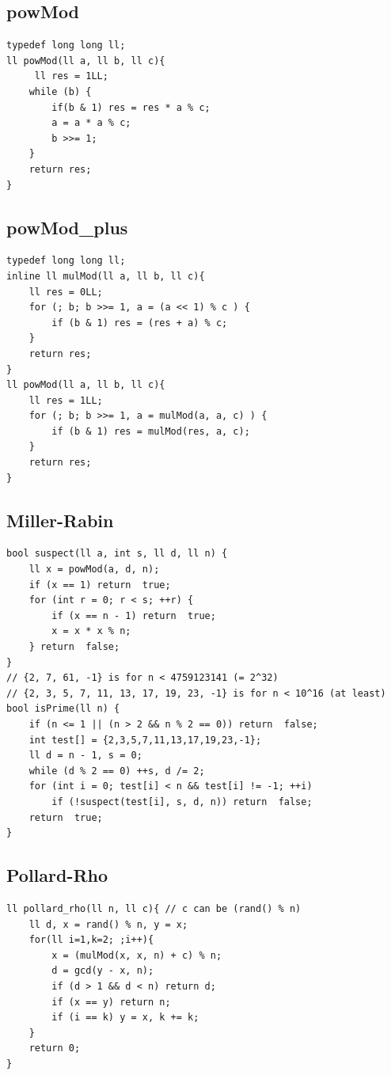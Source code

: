 \documentclass[a4paper]{article}
\begin{document}
\begin{CJK*}{UTF8}{gbsn}
\begin{multicols}{3}
\begin{flushleft}
\subsection{powMod}
\begin{lstlisting}
typedef long long ll;
ll powMod(ll a, ll b, ll c){
	 ll res = 1LL;
	while (b) {
		if(b & 1) res = res * a % c;
		a = a * a % c;
		b >>= 1;
	}
	return res;
}
\end{lstlisting}

\subsection{powMod\_plus}
\begin{lstlisting}
typedef long long ll;
inline ll mulMod(ll a, ll b, ll c){
	ll res = 0LL;
	for (; b; b >>= 1, a = (a << 1) % c ) {
		if (b & 1) res = (res + a) % c;
	}
	return res;
}
ll powMod(ll a, ll b, ll c){
	ll res = 1LL;
	for (; b; b >>= 1, a = mulMod(a, a, c) ) {
		if (b & 1) res = mulMod(res, a, c);
	}
	return res;
}
\end{lstlisting}

\subsection{Miller-Rabin}
\begin{lstlisting}
bool suspect(ll a, int s, ll d, ll n) {
	ll x = powMod(a, d, n);
	if (x == 1) return  true;
	for (int r = 0; r < s; ++r) {
		if (x == n - 1) return  true;
		x = x * x % n;
	} return  false;
}
// {2, 7, 61, -1} is for n < 4759123141 (= 2^32)
// {2, 3, 5, 7, 11, 13, 17, 19, 23, -1} is for n < 10^16 (at least)
bool isPrime(ll n) {
	if (n <= 1 || (n > 2 && n % 2 == 0)) return  false;
	int test[] = {2,3,5,7,11,13,17,19,23,-1};
	ll d = n - 1, s = 0;
	while (d % 2 == 0) ++s, d /= 2;
	for (int i = 0; test[i] < n && test[i] != -1; ++i)
		if (!suspect(test[i], s, d, n)) return  false;
	return  true;
}
\end{lstlisting}

\subsection{Pollard-Rho}
\begin{lstlisting}
ll pollard_rho(ll n, ll c){ // c can be (rand() % n)
	ll d, x = rand() % n, y = x;
	for(ll i=1,k=2; ;i++){
		x = (mulMod(x, x, n) + c) % n;
		d = gcd(y - x, n);
		if (d > 1 && d < n) return d;
		if (x == y) return n;
		if (i == k) y = x, k += k;
	}
	return 0;
}
\end{lstlisting}


\end{flushleft}
\end{multicols}
\end{CJK*}
\end{document}
